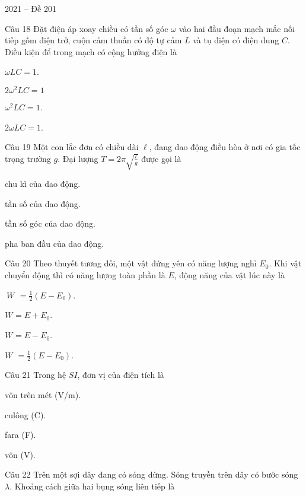 \documentclass{book}
\begin{document}
\begin{quiz}{2021 – Đề 201}
\begin{multi}[points=1]{Câu 18}
 Đặt điện áp xoay chiều có tần số góc $\omega $ vào hai đầu đoạn mạch mắc nối tiếp gồm điện trở, cuộn cảm thuần có độ tự cảm $L$ và tụ điện có điện dung $C$. Điều kiện để trong mạch có cộng hưởng điện là

\item  $\omega LC=1$.	
\item  $2{{\omega }^{2}}LC=1$	
\item*  ${{\omega }^{2}}LC=1$.	
\item  $2\omega LC=1$.
\end{multi}

\begin{multi}[points=1]{Câu 19}
 Một con lắc đơn có chiều dài $\ell $, đang dao động điều hòa ở nơi có gia tốc trọng trường $g$. Đại lượng $T=2\pi \sqrt{\frac{l}{g}}$ được gọi là 

\item*  chu kì của dao động. 	
\item  tần số của dao động.	
\item  tần số góc của dao động. 	
\item  pha ban đầu của dao động. 
\end{multi}

\begin{multi}[points=1]{Câu 20}
 Theo thuyết tương đối, một vật đứng yên có năng lượng nghỉ ${{E}_{0}}$. Khi vật chuyển động thì có năng lượng toàn phần là $E$, động năng của vật lúc này là

\item $~{{W}_{}}$ $=\frac{1}{2}\left( E-{{E}_{0}} \right)$.	
\item  ${{W}_{}}=E+{{E}_{0}}$.	
\item*  ${{W}_{}}=E-{{E}_{0}}$.	
\item  ${{W}_{}}$ $=\frac{1}{2}\left( E-{{E}_{0}} \right)$.
\end{multi}

\begin{multi}[points=1]{Câu 21}
 Trong hệ $SI$, đơn vị của điện tích là

\item  vôn trên mét (V/m).	
\item*  culông (C).	
\item  fara (F).	
\item  vôn (V).
\end{multi}

\begin{multi}[points=1]{Câu 22}
 Trên một sợi dây đang có sóng dừng. Sóng truyền trên dây có bước sóng $\lambda $. Khoảng cách giữa hai bụng sóng liên tiếp là 


\end{multi}
\end{quiz}
\end{document}
